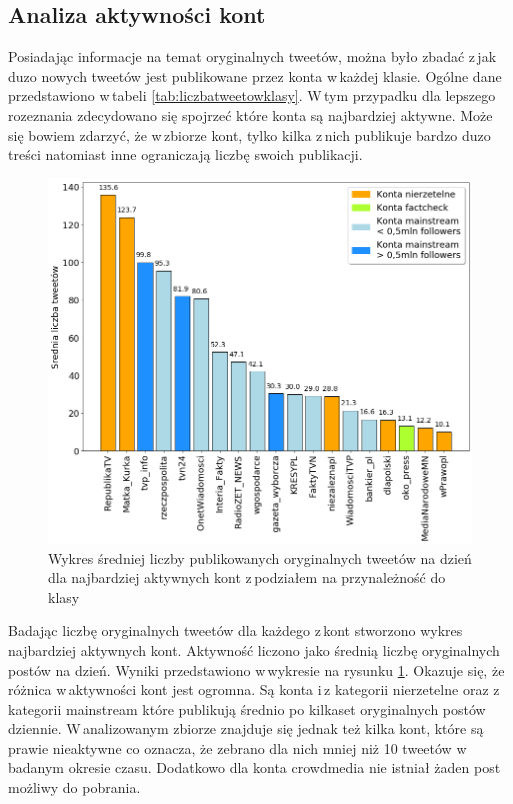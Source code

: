 \subsection{Analiza aktywności kont}
Posiadając informacje na temat oryginalnych tweetów, można było zbadać z\,jak duzo nowych tweetów jest publikowane przez konta w\,każdej klasie. Ogólne dane przedstawiono w\,tabeli \ref{tab:liczbatweetowklasy}. W\,tym przypadku dla lepszego rozeznania zdecydowano się spojrzeć które konta są najbardziej aktywne. Może się bowiem zdarzyć, że w\,zbiorze kont, tylko kilka z\,nich publikuje bardzo duzo treści natomiast inne ograniczają liczbę swoich publikacji. 
\par
\begin{figure}[!h]
	\centering \includegraphics[width=0.9\linewidth]{img/results/tweetsperday.png}
	\caption{Wykres średniej liczby publikowanych oryginalnych tweetów na dzień dla najbardziej aktywnych kont z\,podziałem na przynależność do klasy} \label{fig:tweetsperday}
\end{figure}
\par
Badając liczbę oryginalnych tweetów dla każdego z\,kont stworzono wykres najbardziej aktywnych kont. Aktywność liczono jako średnią liczbę oryginalnych postów na dzień. Wyniki przedstawiono w\,wykresie na rysunku \ref{fig:tweetsperday}. Okazuje się, że różnica w\,aktywności kont jest ogromna. Są konta i\,z kategorii nierzetelne oraz z\,kategorii mainstream które publikują średnio po kilkaset oryginalnych postów dziennie. W\,analizowanym zbiorze znajduje się jednak też kilka kont, które są prawie nieaktywne co oznacza, że zebrano dla nich mniej niż 10 tweetów w\,badanym okresie czasu. Dodatkowo dla konta crowdmedia nie istniał żaden post możliwy do pobrania.